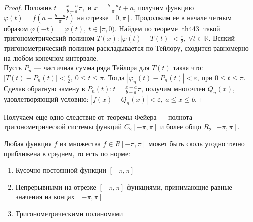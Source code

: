 \begin{proof}
  Положив $t = \frac{x - a}{b - a} \pi,$ и $x = \frac{b - a}{\pi}t + a$, получим
  функцию $\varphi(t) = f(a + \frac{b - a}{\pi}t)$ на отрезке $[0, \pi]$.
  Продолжим ее в начале четным образом $\varphi(-t) = \varphi(t), \ t \in [\pi,
  0)$. Найдем по теореме \eqref{th443} такой тригонометрический полином
  $T(x): |\varphi(t) - T(t)| < \frac{\varepsilon}{2}, \ \forall t \in
  \mathbb{R}$. Всякий тригонометрический полином раскладывается по Тейлору,
  сходится равномерно на любом конечном интервале. \\
  Пусть $P_n$ --- частичная сумма ряда Тейлора для $T(t)$ такая что: $|T(t) -
  P_n(t)| < \frac{\varepsilon}{2}, \ 0 \leq t \leq \pi$. Тогда $|\varphi_n(t) -
  P_n(t)| < \varepsilon$, при $0 \leq t \leq \pi$. Сделав обратную замену в
  $P_n(t): t = \frac{x - a}{b - a} \pi$, получим многочлен $Q_n(x)$,
  удовлетворяющий условию: $|f(x) - Q_n(x)| < \varepsilon, \ a \leq x \leq b$.
\end{proof}

Получаем еще одно следствие от теоремы Фейера --- полнота тригонометрической
системы функций $C_2[-\pi, \pi]$ и более общо $R_2[-\pi,
\pi]$.

\begin{theorem}
  \label{th445}
  Любая функция $f$ из множества $f \in R[-\pi, \pi]$ может быть сколь угодно
  точно приближена в среднем, то есть по норме:
  \begin{enumerate}
    \item Кусочно-постоянной функции $[-\pi, \pi]$
    \item Непрерывными на отрезке $[-\pi, \pi]$ функциями, принимающие равные
      значения на концах $[-\pi, \pi]$
    \item Тригонометрическими полиномами
  \end{enumerate}
\end{theorem}

